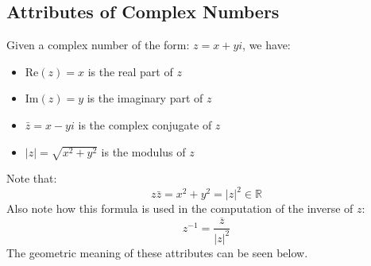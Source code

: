 \documentclass[12pt]{article}
\theoremstyle{definition}
\theoremstyle{plain}
\begin{document}
\subsection{Attributes of Complex Numbers}
Given a complex number of the form: $z = x + yi$, we have:
\begin{itemize}
  \item Re$(z) = x$ is the real part of $z$ \
  \item Im$(z) = y$ is the imaginary part of $z$ 
  \item $\bar{z} = x - yi$ is the complex conjugate of $z$
  \item $|z| = \sqrt{x^2 + y^2}$ is the modulus of $z$
\end{itemize}
Note that: 
\[
z\bar{z} = x^2 + y^2 = |z|^2 \in \mathbb{R}
\]
Also note how this formula is used in the computation of the inverse of $z$:
\[
z^{-1} = \frac{\overline{z}}{|z|^2}
\]
The geometric meaning of these attributes can be seen below.
\begin{center}

\end{center}
\end{document}
